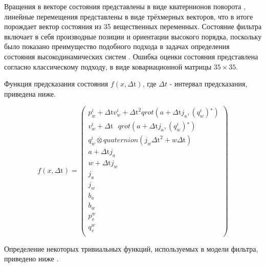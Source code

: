 \documentclass[11pt,a4paper]{article}
\begin{document}
Вращения в векторе состояния представлены в виде кватернионов поворота \cite{QuaternionsMadgwick}, линейные перемещения представлены в виде трёхмерных векторов, что в итоге порождает вектор состояния из 35 вещественных переменных. Состояние фильтра включает в себя производные позиции и ориентации высокого порядка, поскольку было показано преимущество подобного подхода в задачах определения состояния высокодинамических систем \cite{Kishore94}. Ошибка оценки состояния представлена согласно классическому подходу, в виде ковариационной матрицы $35 \times 35$.

Функция предсказания состояния $f(x,\text{$\Delta $t})$, где $\Delta t$ - интервал предсказания, приведена ниже.

\begin{equation}
    \label{eq:f}
    f(x,\text{$\Delta $t})=\left(
    \begin{array}{c}
    p_w^i+\text{$\Delta $t} v_w^i+\text{$\Delta $t}^2 qrot\left(a+\text{$\Delta $t} j_a,\left(q_w^i\right){}^*\right) \\
    v_w^i+\text{$\Delta $t} \text{ } qrot\left(a+\text{$\Delta $t} j_a,\left(q_w^i\right){}^*\right) \\
    q_w^i\otimes quaternion\left(j_w \text{$\Delta $t}^2+w \text{$\Delta $t}\right) \\
    a+\text{$\Delta $t} j_a \\
    w+\text{$\Delta $t} j_w \\
    j_a \\
    j_w \\
    b_a \\
    b_w \\
    p_v^w \\
    q_v^w \\
    \end{array}
    \right)
\end{equation}

Определение некоторых тривиальных функций, используемых в модели фильтра, приведено ниже \cite{QuaternionsMadgwick, QuaternionsNASA}.
\end{document}
